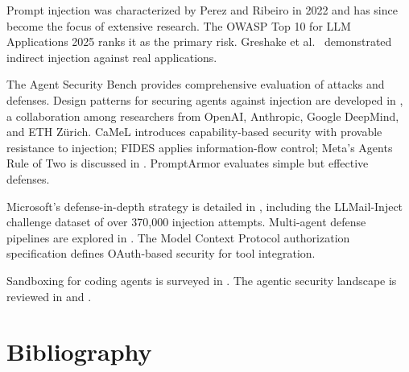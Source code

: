 \documentclass[11pt]{book}
\begin{document}
Prompt injection was characterized by Perez and Ribeiro in 2022 and has since become the focus of extensive research. The OWASP Top 10 for LLM Applications 2025 \cite{owasp2025} ranks it as the primary risk. Greshake et al.\ \cite{greshake2023} demonstrated indirect injection against real applications.

The Agent Security Bench \cite{asb2025} provides comprehensive evaluation of attacks and defenses. Design patterns for securing agents against injection are developed in \cite{designpatterns2025}, a collaboration among researchers from OpenAI, Anthropic, Google DeepMind, and ETH Z\"urich. CaMeL \cite{camel2025} introduces capability-based security with provable resistance to injection; FIDES \cite{fides2025} applies information-flow control; Meta's Agents Rule of Two is discussed in \cite{ruleoftwo2025}. PromptArmor \cite{promptarmor2025} evaluates simple but effective defenses.

Microsoft's defense-in-depth strategy is detailed in \cite{msdefense2025}, including the LLMail-Inject challenge dataset of over 370{,}000 injection attempts. Multi-agent defense pipelines are explored in \cite{multiagentdefense2025}. The Model Context Protocol authorization specification \cite{mcpauth2025} defines OAuth-based security for tool integration.

Sandboxing for coding agents is surveyed in \cite{sandbox2025}. The agentic security landscape is reviewed in \cite{agenticsecurity2025} and \cite{threatsurvey2025}.

\section*{Bibliography}
\end{document}
